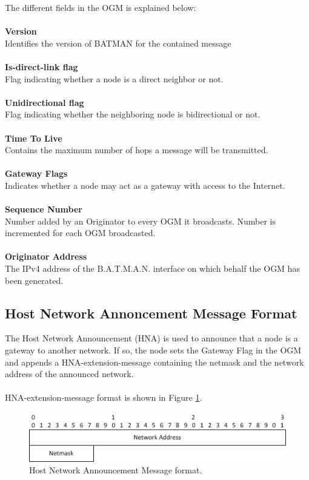\noindent
The different fields in the OGM is explained below:
\\\\
\textbf{Version} \\
Identifies the version of BATMAN for the contained message
\\\\
\textbf{Is-direct-link flag} \\
Flag indicating whether a node is a direct neighbor or not.
\\\\
\textbf{Unidirectional flag} \\
Flag indicating whether the neighboring node is bidirectional or not.
\\\\
\textbf{Time To Live} \\
Contains the maximum number of hops a message will be transmitted.
\\\\
\textbf{Gateway Flags} \\
Indicates whether a node may act as a gateway with access to the Internet. 
\\\\
\textbf{Sequence Number} \\
Number added by an Originator to every OGM it broadcasts. Number is incremented for each OGM broadcasted.
\\\\
\textbf{Originator Address} \\ 
The IPv4 address of the B.A.T.M.A.N. interface on which behalf the OGM has been generated.


\subsection{Host Network Annoncement Message Format}
The Host Network Announcement (HNA) is used to announce that a node is a gateway to another network. If so, the node sets the Gateway Flag in the OGM and appends a HNA-extension-message containing the netmask and the network address of the announced network.
\\\\
HNA-extension-message format is shown in Figure \ref{fig:app_hna}.

\begin{figure}[ht]
	\centering
		\includegraphics{images/hna.png}
	\caption{Host Network Announcement Message format.}
	\label{fig:app_hna}
\end{figure}


